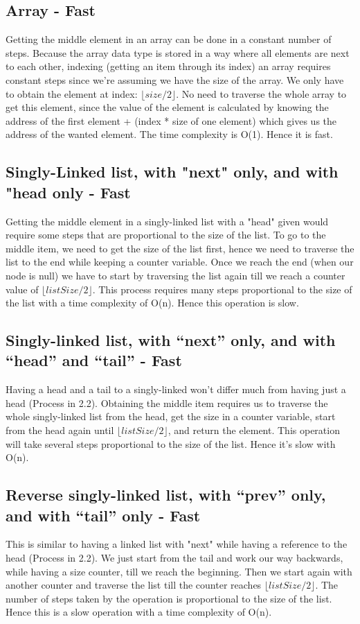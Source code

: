 \documentclass{article}
\begin{document}
\subsection{Array - Fast}
Getting the middle element in an array can be done in a constant number of steps. Because the array data type is stored in a way where all elements are next to each other, indexing (getting an item through its index) an array requires constant steps since we're assuming we have the size of the array. We only have to obtain the element at index: $\lfloor {size/2} \rfloor$. No need to traverse the whole array to get this element, since the value of the element is calculated by knowing the address of the first element + (index * size of one element) which gives us the address of the wanted element. The time complexity is O(1). Hence it is fast.

\subsection{Singly-Linked list, with "next" only, and with "head only - Fast}
Getting the middle element in a singly-linked list with a "head" given would require some steps that are proportional to the size of the list. To go to the middle item, we need to get the size of the list first, hence we need to traverse the list to the end while keeping a counter variable. Once we reach the end (when our node is null) we have to start by traversing the list again till we reach a counter value of $\lfloor {listSize/2} \rfloor$. This process requires many steps proportional to the size of the list with a time complexity of O(n). Hence this operation is slow.

\subsection{Singly-linked list, with “next” only, and with “head” and “tail” - Fast}
Having a head and a tail to a singly-linked won't differ much from having just a head (Process in 2.2). Obtaining the middle item requires us to traverse the whole singly-linked list from the head, get the size in a counter variable, start from the head again until $\lfloor {listSize/2} \rfloor$, and return the element. This operation will take several steps proportional to the size of the list. Hence it's slow with O(n).

\subsection{Reverse singly-linked list, with “prev” only, and with “tail” only - Fast}
This is similar to having a linked list with "next" while having a reference to the head (Process in 2.2). We just start from the tail and work our way backwards, while having a size counter, till we reach the beginning. Then we start again with another counter and traverse the list till the counter reaches $\lfloor {listSize/2} \rfloor$. The number of steps taken by the operation is proportional to the size of the list. Hence this is a slow operation with a time complexity of O(n).
\end{document}
